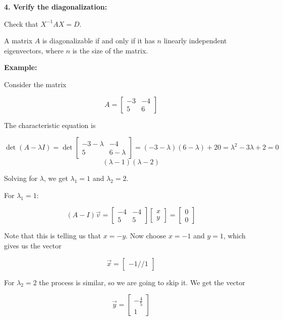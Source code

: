 \textbf{4. Verify the diagonalization:}
    
Check that \(X^{-1}AX = D\).

A matrix \(A\) is diagonalizable if and only if it has \(n\) linearly independent eigenvectors, where 
\(n\) is the size of the matrix.

\textbf{Example: }

Consider the matrix

\[
    A = \begin{bmatrix}
    -3 & -4 \\
    5 & 6
    \end{bmatrix}
\]

The characteristic equation is

\[
    \det(A - \lambda I) 
    = \det 
    \begin{bmatrix}
            -3 - \lambda & -4 \\
        5 & 6 - \lambda
    \end{bmatrix} 
    = (-3 - \lambda)(6 - \lambda) + 20 = \lambda^2 - 3\lambda + 2 = 0    
\]
\[
    (\lambda - 1)(\lambda - 2)
\]

Solving for \(\lambda\), we get \(\lambda_1 = 1\) and \(\lambda_2 = 2\).

For \(\lambda_1 = 1\):

\[
   (A - I)\vec{v} = \begin{bmatrix}
    -4 & -4 \\
    5 & 5
    \end{bmatrix} \begin{bmatrix}
    x \\
    y
    \end{bmatrix} = \begin{bmatrix}
    0 \\
    0
    \end{bmatrix}
\]

Note that this is telling us that \(x = -y\). Now choose \(x = -1\) and \(y = 1\), which gives us 
the vector 

\[
    \vec{x} = \begin{bmatrix}
        -1 // 1
    \end{bmatrix}
\]

For \(\lambda_2 = 2\) the process is similar, so we are going to skip it. We get the vector

\[
    \vec{y} = \begin{bmatrix}
        -\frac{4}{5} \\ 1
    \end{bmatrix}
\]

